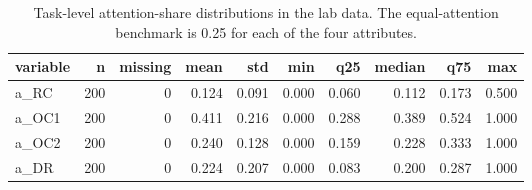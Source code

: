 \begin{table}
\caption{Task-level attention-share distributions in the lab data. The equal-attention benchmark is 0.25 for each of the four attributes.}
\label{tab:lab_attention_summary}
\begin{tabular}{lrrrrrrrrr}
\toprule
variable & n & missing & mean & std & min & q25 & median & q75 & max \\
\midrule
a\_RC & 200 & 0 & 0.124 & 0.091 & 0.000 & 0.060 & 0.112 & 0.173 & 0.500 \\
a\_OC1 & 200 & 0 & 0.411 & 0.216 & 0.000 & 0.288 & 0.389 & 0.524 & 1.000 \\
a\_OC2 & 200 & 0 & 0.240 & 0.128 & 0.000 & 0.159 & 0.228 & 0.333 & 1.000 \\
a\_DR & 200 & 0 & 0.224 & 0.207 & 0.000 & 0.083 & 0.200 & 0.287 & 1.000 \\
\bottomrule
\end{tabular}
\end{table}
